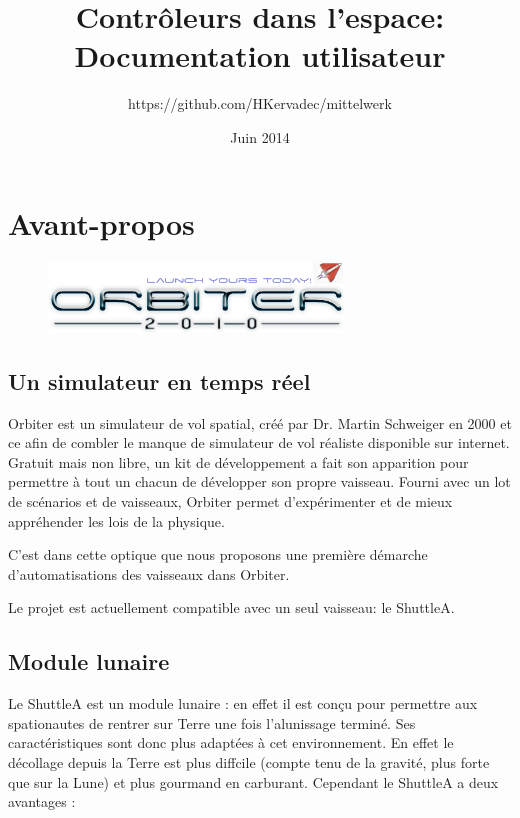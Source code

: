 \documentclass[a4paper,11pt]{article}
\title{\textbf{Contrôleurs dans l'espace: \\Documentation utilisateur}}
\author{https://github.com/HKervadec/mittelwerk}
\date{Juin 2014}
\begin{document}
          
\maketitle           

\tableofcontents

\setlength{\parskip}{5pt}	


\section{Avant-propos}
    \begin{figure}[!h]
                \begin{center}
                    \includegraphics[width=0.7\textwidth]{img/orbiter_logo.png}
                \end{center}
    \end{figure}

    \subsection{Un simulateur en temps réel}
        Orbiter est un simulateur de vol spatial, créé par Dr. Martin Schweiger en 2000 et ce afin de combler le manque de simulateur de vol réaliste disponible sur internet. Gratuit mais non libre, un kit de développement a fait son apparition pour permettre à tout un chacun de développer son propre vaisseau. Fourni avec un lot de scénarios et de vaisseaux, Orbiter permet d'expérimenter et de mieux appréhender les lois de la physique.

        C'est dans cette optique que nous proposons une première démarche d'automatisations des vaisseaux dans Orbiter.

        Le projet est actuellement compatible avec un seul vaisseau: le ShuttleA.

    \subsection{Module lunaire}
        Le ShuttleA est un module lunaire : en effet il est conçu pour permettre aux spationautes de rentrer sur Terre une fois l'alunissage terminé. Ses caractéristiques sont donc plus adaptées à cet environnement. En effet le décollage depuis la Terre est plus diffcile (compte tenu de la gravité, plus forte que sur la Lune) et plus gourmand en carburant. Cependant le ShuttleA a deux avantages :
\end{document}
